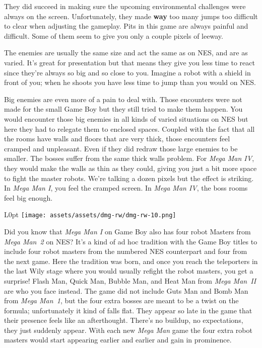 \documentclass{book}
\let\oldcenter\center
\let\oldendcenter\endcenter
\renewenvironment{center}{\setlength\topsep{0pt}\oldcenter}{\oldendcenter}
\begin{document}
They did succeed in making sure the upcoming environmental challenges were always on the screen. Unfortunately, they made \textbf{way} too many jumps too difficult to clear when adjusting the gameplay. Pits in this game are always painful and difficult. Some of them seem to give you only a couple pixels of leeway.

The enemies are usually the same size and act the same as on NES, and are as varied. It’s great for presentation but that means they give you less time to react since they’re always so big and so close to you. Imagine a robot with a shield in front of you; when he shoots you have less time to jump than you would on NES.

\begin{center}
\quad\vspace{4pt}
\quad\vspace{4pt}
\end{center}
Big enemies are even more of a pain to deal with. Those encounters were not made for the small Game Boy but they still tried to make them happen. You would encounter those big enemies in all kinds of varied situations on NES but here they had to relegate them to enclosed spaces. Coupled with the fact that all the rooms have walls and floors that are very thick, those encounters feel cramped and unpleasant. Even if they did redraw those large enemies to be smaller. The bosses suffer from the same thick walls problem. For \emph{Mega Man IV}, they would make the walls as thin as they could, giving you just a bit more space to fight the master robots. We’re talking a dozen pixels but the effect is striking. In \emph{Mega Man I}, you feel the cramped screen. In \emph{Mega Man IV}, the boss rooms feel big enough.

\begin{wrapfigure}{L}{0pt} \texttt{[image: assets/assets/dmg-rw/dmg-rw-10.png]}\end{wrapfigure}
Did you know that \emph{Mega Man I} on Game Boy also has four robot Masters from \emph{Mega Man~2} on NES? It’s a kind of ad hoc tradition with the Game Boy titles to include four robot masters from the numbered NES counterpart and four from the next game. Here the tradition was born, and once you reach the teleporters in the last Wily stage where you would usually refight the robot masters, you get a surprise! Flash Man, Quick Man, Bubble Man, and Heat Man from \emph{Mega Man~II} are who you face instead. The game did not include Guts Man and Bomb Man from \emph{Mega Man~1}, but the four extra bosses are meant to be a twist on the formula; unfortunately it kind of falls flat. They appear so late in the game that their presence feels like an afterthought. There’s no buildup, no expectations, they just suddenly appear. With each new \emph{Mega Man} game the four extra robot masters would start appearing earlier and earlier and gain in prominence.
\end{document}
